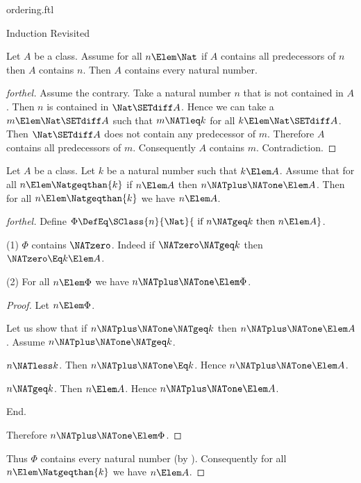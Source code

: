 \documentclass{stex}
\begin{document}
\begin{smodule}{ordering.ftl}
\begin{sfragment}{Induction Revisited}
  \begin{theorem}[forthel,name=induction II]
    Let $A$ be a class.
    Assume for all $n \Elem \Nat$ if $A$ contains all predecessors of $n$ then $A$ contains $n$.
    Then $A$ contains every natural number.
  \end{theorem}
  \begin{proof}[forthel]
    Assume the contrary.
    Take a natural number $n$ that is not contained in $A$.
    Then $n$ is contained in $\Nat \SETdiff A$.
    Hence we can take a $m \Elem \Nat \SETdiff A$ such that $m \NATleq k$ for all $k \Elem \Nat \SETdiff A$.
    Then $\Nat \SETdiff A$ does not contain any predecessor of $m$.
    Therefore $A$ contains all predecessors of $m$.
    Consequently $A$ contains $m$.
    Contradiction.
  \end{proof}


  \begin{theorem}[forthel,name=induction III]
    Let $A$ be a class.
    Let $k$ be a natural number such that $k \Elem A$.
    Assume that for all $n \Elem \Natgeqthan{k}$ if $n \Elem A$ then $n \NATplus \NATone \Elem A$.
    Then for all $n \Elem \Natgeqthan{k}$ we have $n \Elem A$.
  \end{theorem}
  \begin{proof}[forthel]
    Define $\Phi \DefEq \SClass{n}{\Nat}{\text{ if }n \NATgeq k\text{ then }n \Elem A}$.

    (1) $\Phi$ contains $\NATzero$.
    Indeed if $\NATzero \NATgeq k$ then $\NATzero \Eq k \Elem A$.

    (2) For all $n \Elem \Phi$ we have $n \NATplus \NATone \Elem \Phi$.
    \begin{proof}
      Let $n \Elem \Phi$.

      Let us show that if $n \NATplus \NATone \NATgeq k$ then $n \NATplus \NATone \Elem A$.
        Assume $n \NATplus \NATone \NATgeq k$.

        \begin{case}{$n \NATless k$.}
          Then $n \NATplus \NATone \Eq k$.
          Hence $n \NATplus \NATone \Elem A$.
        \end{case}

        \begin{case}{$n \NATgeq k$.}
          Then $n \Elem A$.
          Hence $n \NATplus \NATone \Elem A$.
        \end{case}
      End.

      Therefore $n \NATplus \NATone \Elem \Phi$.
    \end{proof}

    Thus $\Phi$ contains every natural number (by ).
    Consequently for all $n \Elem \Natgeqthan{k}$ we have $n \Elem A$.
  \end{proof}
\end{sfragment}
\end{smodule}
\end{document}
